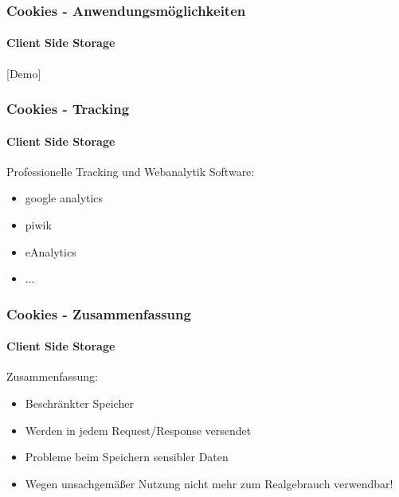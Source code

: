 \begin{frame}
\frametitle{Cookies - Anwendungsmöglichkeiten}
\framesubtitle{Client Side Storage}

	\begin{center}
		\large [Demo]
	\end{center}
\end{frame}

\begin{frame}
\frametitle{Cookies - Tracking	 }
\framesubtitle{Client Side Storage}

	Professionelle Tracking und Webanalytik	 Software:
	\begin{itemize}
		\item google analytics
		\item piwik 
		\item eAnalytics
		\item ...
	\end{itemize}
\end{frame}

\begin{frame}
\frametitle{Cookies - Zusammenfassung	 }
\framesubtitle{Client Side Storage}

	Zusammenfassung:
	\begin{itemize}
		\item Beschränkter Speicher
		\item Werden in jedem Request/Response versendet
		\item Probleme beim Speichern sensibler Daten
		\item Wegen unsachgemäßer Nutzung nicht mehr zum Realgebrauch verwendbar!
	\end{itemize}
\end{frame}